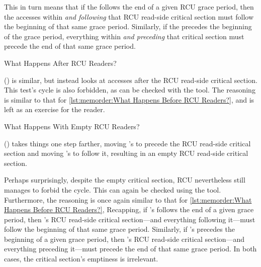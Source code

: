 This in turn means that if the  follows the end of a
given RCU grace period, then the accesses within \emph{and following}
that RCU read-side critical section must follow the beginning of that
same grace period.
Similarly, if the  precedes the beginning of the grace
period, everything within \emph{and preceding} that critical section
must precede the end of that same grace period.

\begin{listing}[tbp]

\caption{What Happens After RCU Readers?}
\label{lst:memorder:What Happens After RCU Readers?}
\end{listing}

()
is similar, but instead looks at accesses after the RCU read-side
critical section.
This test's cycle is also forbidden, as can be checked with the 
tool.
The reasoning is similar to that for
\cref{lst:memorder:What Happens Before RCU Readers?},
and is left as an exercise for the reader.

\begin{listing}[tbp]

\caption{What Happens With Empty RCU Readers?}
\label{lst:memorder:What Happens With Empty RCU Readers?}
\end{listing}

()
takes things one step farther, moving 's 
to precede the RCU read-side critical section and moving
's  to follow it, resulting in an
empty RCU read-side critical section.

Perhaps surprisingly, despite the empty critical section, RCU nevertheless
still manages to forbid the cycle.
This can again be checked using the  tool.
Furthermore, the reasoning is once again similar to that for
\cref{lst:memorder:What Happens Before RCU Readers?},
Recapping, if 's  follows the end of a given
grace period, then 's RCU read-side critical section---and
everything following it---must follow the beginning of that same grace
period.
Similarly, if 's  precedes the beginning of a
given grace period, then 's RCU read-side critical section---and
everything preceding it---must precede the end of that same grace period.
In both cases, the critical section's emptiness is irrelevant.

